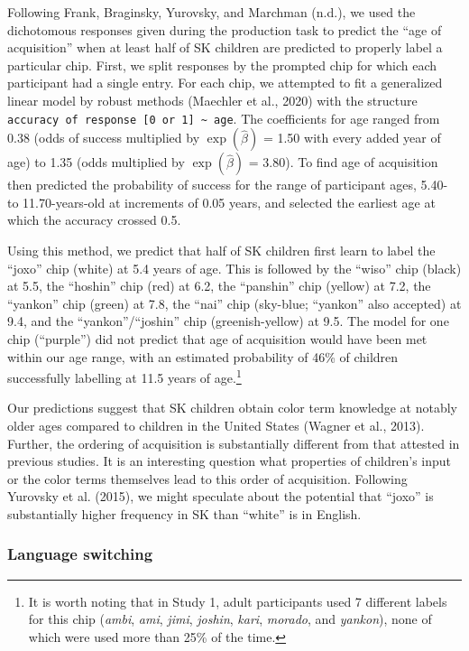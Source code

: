 \documentclass[
  english,
  ,man,floatsintext]{apa6}
\begin{document}
Following Frank, Braginsky, Yurovsky, and Marchman (n.d.), we used the dichotomous responses given during the production task to predict the \enquote{age of acquisition} when at least half of SK children are predicted to properly label a particular chip. First, we split responses by the prompted chip for which each participant had a single entry. For each chip, we attempted to fit a generalized linear model by robust methods (Maechler et al., 2020) with the structure \texttt{accuracy\ of\ response\ {[}0\ or\ 1{]}\ \textasciitilde{}\ age}. The coefficients for age ranged from 0.38 (odds of success multiplied by \(\exp{(\hat{\beta})}\) = 1.50 with every added year of age) to 1.35 (odds multiplied by \(\exp{(\hat{\beta})}\) = 3.80). To find age of acquisition then predicted the probability of success for the range of participant ages, 5.40- to 11.70-years-old at increments of 0.05 years, and selected the earliest age at which the accuracy crossed 0.5.

Using this method, we predict that half of SK children first learn to label the \enquote{joxo} chip (white) at 5.4 years of age. This is followed by the \enquote{wiso} chip (black) at 5.5, the \enquote{hoshin} chip (red) at 6.2, the \enquote{panshin} chip (yellow) at 7.2, the \enquote{yankon} chip (green) at 7.8, the \enquote{nai} chip (sky-blue; \enquote{yankon} also accepted) at 9.4, and the \enquote{yankon}/\enquote{joshin} chip (greenish-yellow) at 9.5. The model for one chip (\enquote{purple}) did not predict that age of acquisition would have been met within our age range, with an estimated probability of 46\% of children successfully labelling at 11.5 years of age.\footnote{It is worth noting that in Study 1, adult participants used 7 different labels for this chip (\emph{ambi}, \emph{ami}, \emph{jimi}, \emph{joshin}, \emph{kari}, \emph{morado}, and \emph{yankon}), none of which were used more than 25\% of the time.}

Our predictions suggest that SK children obtain color term knowledge at notably older ages compared to children in the United States (Wagner et al., 2013). Further, the ordering of acquisition is substantially different from that attested in previous studies. It is an interesting question what properties of children's input or the color terms themselves lead to this order of acquisition. Following Yurovsky et al. (2015), we might speculate about the potential that \enquote{joxo} is substantially higher frequency in SK than \enquote{white} is in English.

\hypertarget{language-switching}{%
\subsubsection{Language switching}\label{language-switching}}
\end{document}
